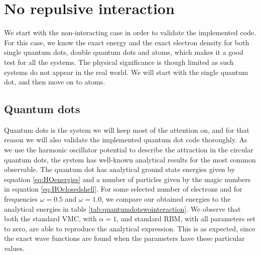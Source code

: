 \newpage
\section{No repulsive interaction} \label{sec:norepulsive}
We start with the non-interacting case in order to validate the implemented code. For this case, we know the exact energy and the exact electron density for both single quantum dots, double quantum dots and atoms, which makes it a good test for all the systems. The physical significance is though limited as such systems do not appear in the real world. We will start with the single quantum dot, and then move on to atoms. 

\subsection{Quantum dots}
Quantum dots is the system we will keep most of the attention on, and for that reason we will also validate the implemented quantum dot code thoroughly. As we use the harmonic oscillator potential to describe the attraction in the circular quantum dots, the system has well-known analytical results for the most common observable. The quantum dot has analytical ground state energies given by equation \eqref{eq:HOenergies} and a number of particles given by the magic numbers in equation \eqref{eq:HOclosedshell}. For some selected number of electrons and for frequencies $\omega=0.5$ and $\omega=1.0$, we compare our obtained energies to the analytical energies in table \eqref{tab:quantumdotswointeraction}. We observe that both the standard VMC, with $\alpha=1$, and standard RBM, with all parameters set to zero, are able to reproduce the analytical expression. This is as expected, since the exact wave functions are found when the parameters have these particular values.

